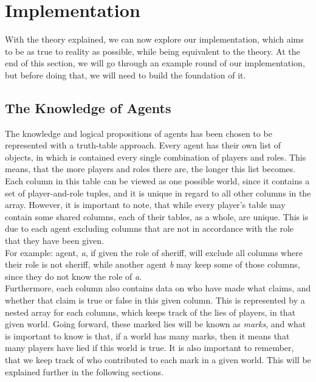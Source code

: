 \section{Implementation}\label{sec:implementation}
With the theory explained, we can now explore our implementation, which aims to 
be as true to reality as possible, while being equivalent to the theory. At the 
end of this section, we will go through an example round of our implementation, 
but before doing that, we will need to build the foundation of it.
\subsection{The Knowledge of Agents}\label{TheKnowledgeOfAgents}
The knowledge and logical propositions of agents has been chosen to be 
represented with a truth-table approach. Every agent has their own 
list of objects, in which is contained every single combination of 
players and roles. This means, that the more players and roles there are, the 
longer this list becomes.\\ 
Each column in this table can be viewed as one possible world, since it 
contains a set of player-and-role tuples, and it is unique in regard to all 
other columns in the array. However, it is important to note, that while every 
player's table may contain some shared columns, each of their tables, as a 
whole, are unique. This is due to each agent excluding columns that are not in 
accordance with the role that they have been given.\\ 
For example: agent, \textit{a}, if given the role of sheriff, will exclude all 
columns where their role is not sheriff, while another agent \textit{b} may 
keep some of those columns, since they do not know the role of \textit{a}.\\
Furthermore, each column also contains data on who have made what claims, and 
whether that claim is true or false in this given column. This is represented 
by a nested array for each columns, which keeps track of the lies of players, 
in that given world. Going forward, these marked lies will be known as 
\textit{marks}, and what is important to know is that, if a world has many 
marks, then it means that many players have lied if this world is true. It is 
also important to remember, that we keep track of who contributed to each mark 
in a given world. This will be explained further in the following sections.
